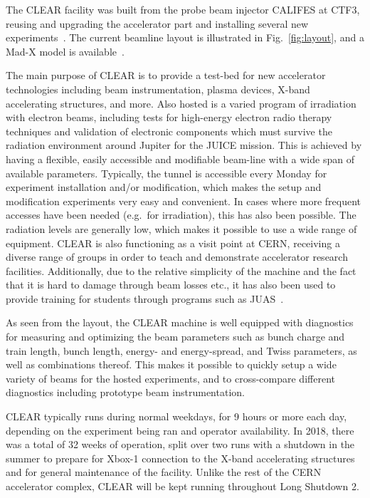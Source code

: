 \documentclass[a4paper,
               keeplastbox,   %
               ]{jacow}
\begin{document}
The CLEAR facility was built from the probe beam injector CALIFES at CTF3, reusing and upgrading the accelerator part and installing several new experiments~\cite{Gamba::CLEAR,Corsini:FirstCLEAR,CLEAR-WEB}.
The current beamline layout is illustrated in Fig.~\ref{fig:layout}, and a Mad-X model is available~\cite{CLEAR-MADX}.

The main purpose of CLEAR is to provide a test-bed for new accelerator technologies including beam instrumentation, plasma devices, X-band accelerating structures, and more.
Also hosted is a varied program of irradiation with electron beams, including tests for high-energy electron radio therapy techniques and validation of electronic components which must survive the radiation environment around Jupiter for the JUICE mission.
This is achieved by having a flexible, easily accessible and modifiable beam-line with a wide span of available parameters.
Typically, the tunnel is accessible every Monday for experiment installation and/or modification, which makes the setup and modification experiments very easy and convenient.
In cases where more frequent accesses have been needed (e.g.\ for irradiation), this has also been possible.
The radiation levels are generally low, which makes it possible to use a wide range of equipment.
CLEAR is also functioning as a visit point at CERN, receiving a diverse range of groups in order to teach and demonstrate accelerator research facilities.
Additionally, due to the relative simplicity of the machine and the fact that it is hard to damage through beam losses etc., it has also been used to provide training for students through programs such as JUAS~\cite{JUAS19}.

As seen from the layout, the CLEAR machine is well equipped with diagnostics~\cite{HelenPHELMA} for measuring and optimizing the beam parameters such as bunch charge and train length, bunch length, energy- and energy-spread, and Twiss parameters, as well as combinations thereof.
This makes it possible to quickly setup a wide variety of beams for the hosted experiments, and to cross-compare different diagnostics including prototype beam instrumentation.

CLEAR typically runs during normal weekdays, for 9 hours or more each day, depending on the experiment being ran and operator availability.
In 2018, there was a total of 32 weeks of operation, split over two runs with a shutdown in the summer to prepare for Xbox-1 connection to the X-band accelerating structures and for general maintenance of the facility.
Unlike the rest of the CERN accelerator complex, CLEAR will be kept running throughout Long Shutdown 2.
\end{document}
